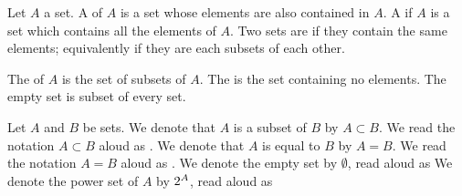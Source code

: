 
Let $A$ a set.
A
of $A$ is a set whose elements
are also contained in $A$.
A
if $A$ is a set which
contains all the elements
of $A$.
Two sets are
if they contain the same
elements; equivalently
if they are each subsets
of each other.

The
of $A$ is the set of subsets of $A$.
The
is the set containing no elements.
The empty set is subset of every set.

Let $A$ and $B$ be sets.
We denote that $A$ is a subset of $B$ by $A \subset B$.
We read the notation $A \subset B$ aloud as .
We denote that $A$ is equal to $B$ by $A = B$.
We read the notation $A = B$ aloud as .
We denote the empty set by $\emptyset$, read aloud as 
We denote the power set of $A$ by $2^{A}$, read aloud as 

\strats
